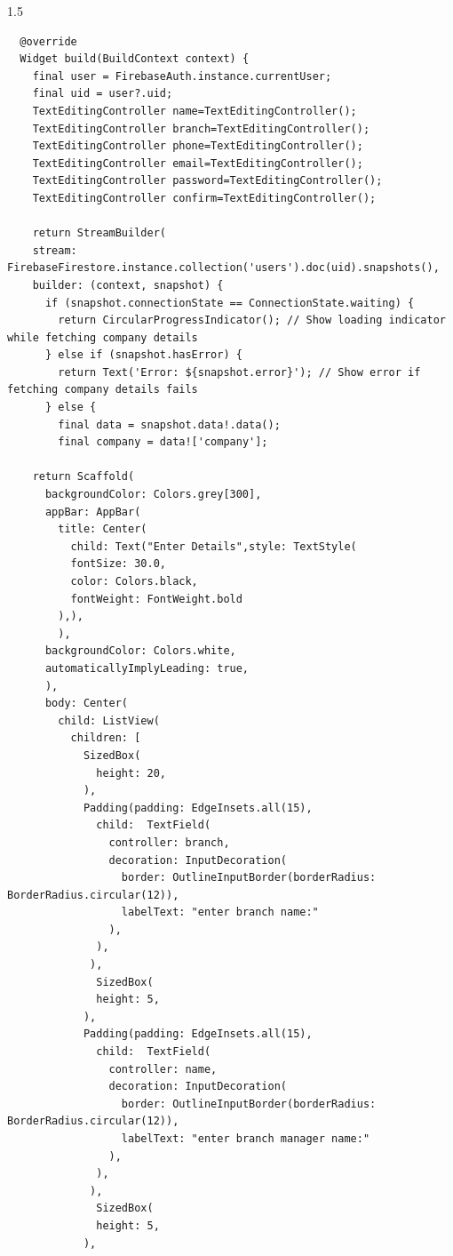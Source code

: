 \begin{spacing}{1.5}
\begin{enumerate}
\begin{verbatim}
  @override
  Widget build(BuildContext context) {
    final user = FirebaseAuth.instance.currentUser;
    final uid = user?.uid;
    TextEditingController name=TextEditingController();
    TextEditingController branch=TextEditingController();
    TextEditingController phone=TextEditingController();
    TextEditingController email=TextEditingController();
    TextEditingController password=TextEditingController();
    TextEditingController confirm=TextEditingController();

    return StreamBuilder(
    stream: FirebaseFirestore.instance.collection('users').doc(uid).snapshots(),
    builder: (context, snapshot) {
      if (snapshot.connectionState == ConnectionState.waiting) {
        return CircularProgressIndicator(); // Show loading indicator while fetching company details
      } else if (snapshot.hasError) {
        return Text('Error: ${snapshot.error}'); // Show error if fetching company details fails
      } else {
        final data = snapshot.data!.data();
        final company = data!['company'];

    return Scaffold(
      backgroundColor: Colors.grey[300],
      appBar: AppBar(
        title: Center(
          child: Text("Enter Details",style: TextStyle(
          fontSize: 30.0,
          color: Colors.black,
          fontWeight: FontWeight.bold
        ),),
        ),
      backgroundColor: Colors.white,
      automaticallyImplyLeading: true,
      ),
      body: Center(
        child: ListView(
          children: [
            SizedBox(
              height: 20,
            ),
            Padding(padding: EdgeInsets.all(15),
              child:  TextField(
                controller: branch,
                decoration: InputDecoration(
                  border: OutlineInputBorder(borderRadius: BorderRadius.circular(12)),
                  labelText: "enter branch name:"
                ),
              ),
             ),
              SizedBox(
              height: 5,
            ),
            Padding(padding: EdgeInsets.all(15),
              child:  TextField(
                controller: name,
                decoration: InputDecoration(
                  border: OutlineInputBorder(borderRadius: BorderRadius.circular(12)),
                  labelText: "enter branch manager name:"
                ),
              ),
             ),
              SizedBox(
              height: 5,
            ),
            

\end{verbatim}
\end{enumerate}
\end{spacing}
